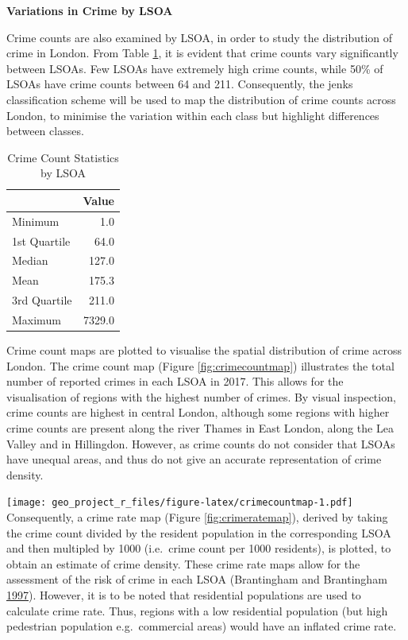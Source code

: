 \documentclass[]{article}
\theoremstyle{definition}
\theoremstyle{definition}
\theoremstyle{definition}
\theoremstyle{remark}
\begin{document}
\textbf{Variations in Crime by LSOA}

Crime counts are also examined by LSOA, in order to study the
distribution of crime in London. From Table \ref{tab:LSOAstats}, it is
evident that crime counts vary significantly between LSOAs. Few LSOAs
have extremely high crime counts, while 50\% of LSOAs have crime counts
between 64 and 211. Consequently, the jenks classification scheme will
be used to map the distribution of crime counts across London, to
minimise the variation within each class but highlight differences
between classes.

\begin{table}

\caption{\label{tab:LSOAstats}Crime Count Statistics by LSOA}
\centering
\begin{tabular}[t]{l|r}
\hline
  & Value\\
\hline
Minimum & 1.0\\
\hline
1st Quartile & 64.0\\
\hline
Median & 127.0\\
\hline
Mean & 175.3\\
\hline
3rd Quartile & 211.0\\
\hline
Maximum & 7329.0\\
\hline
\end{tabular}
\end{table}

Crime count maps are plotted to visualise the spatial distribution of
crime across London. The crime count map (Figure
\ref{fig:crimecountmap}) illustrates the total number of reported crimes
in each LSOA in 2017. This allows for the visualisation of regions with
the highest number of crimes. By visual inspection, crime counts are
highest in central London, although some regions with higher crime
counts are present along the river Thames in East London, along the Lea
Valley and in Hillingdon. However, as crime counts do not consider that
LSOAs have unequal areas, and thus do not give an accurate
representation of crime density.

\texttt{[image: geo\_project\_r\_files/figure-latex/crimecountmap-1.pdf]}
Consequently, a crime rate map (Figure \ref{fig:crimeratemap}), derived
by taking the crime count divided by the resident population in the
corresponding LSOA and then multipled by 1000 (i.e.~crime count per 1000
residents), is plotted, to obtain an estimate of crime density. These
crime rate maps allow for the assessment of the risk of crime in each
LSOA (Brantingham and Brantingham
\protect\hyperlink{ref-Brantingham1997}{1997}). However, it is to be
noted that residential populations are used to calculate crime rate.
Thus, regions with a low residential population (but high pedestrian
population e.g.~commercial areas) would have an inflated crime rate.
\end{document}
